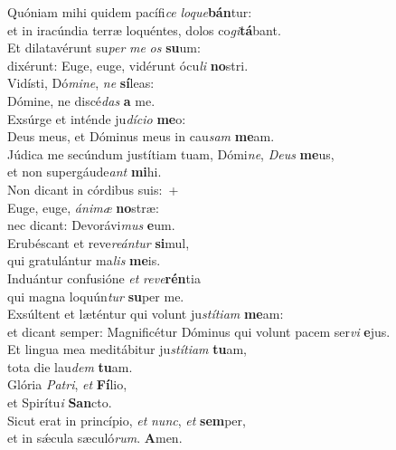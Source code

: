 \oddverse Quóniam mihi quidem pacífi\textit{ce} \textit{lo}\textit{que}\textbf{bán}tur:~\*\\
\oddverse et in iracúndia terræ loquéntes, dolos co\textit{gi}\textbf{tá}bant.\\
\evenverse Et dilatavérunt su\textit{per} \textit{me} \textit{os} \textbf{su}um:~\*\\
\evenverse dixérunt: Euge, euge, vidérunt ócu\textit{li} \textbf{no}stri.\\
\oddverse Vidísti, Dó\textit{mi}\textit{ne}, \textit{ne} \textbf{sí}leas:~\*\\
\oddverse Dómine, ne discé\textit{das} \textbf{a} me.\\
\evenverse Exsúrge et inténde ju\textit{dí}\textit{ci}\textit{o} \textbf{me}o:~\*\\
\evenverse Deus meus, et Dóminus meus in cau\textit{sam} \textbf{me}am.\\
\oddverse Júdica me secúndum justítiam tuam, Dómi\textit{ne}, \textit{De}\textit{us} \textbf{me}us,~\*\\
\oddverse et non supergáude\textit{ant} \textbf{mi}hi.\\
\evenverse Non dicant in córdibus suis:~+\\
\evenverse  Euge, euge, \textit{á}\textit{ni}\textit{mæ} \textbf{no}stræ:~\*\\
\evenverse nec dicant: Devorávi\textit{mus} \textbf{e}um.\\
\oddverse Erubéscant et reve\textit{re}\textit{án}\textit{tur} \textbf{si}mul,~\*\\
\oddverse qui gratulántur ma\textit{lis} \textbf{me}is.\\
\evenverse Induántur confusióne \textit{et} \textit{re}\textit{ve}\textbf{rén}tia~\*\\
\evenverse qui magna loquún\textit{tur} \textbf{su}per me.\\
\oddverse Exsúltent et læténtur qui volunt ju\textit{stí}\textit{ti}\textit{am} \textbf{me}am:~\*\\
\oddverse et dicant semper: Magnificétur Dóminus qui volunt pacem ser\textit{vi} \textbf{e}jus.\\
\evenverse Et lingua mea meditábitur ju\textit{stí}\textit{ti}\textit{am} \textbf{tu}am,~\*\\
\evenverse tota die lau\textit{dem} \textbf{tu}am.\\
\oddverse Glória \textit{Pa}\textit{tri}, \textit{et} \textbf{Fí}lio,~\*\\
\oddverse et Spirítu\textit{i} \textbf{San}cto.\\
\evenverse Sicut erat in princípio, \textit{et} \textit{nunc}, \textit{et} \textbf{sem}per,~\*\\
\evenverse et in sǽcula sæculó\textit{rum}. \textbf{A}men.\\
